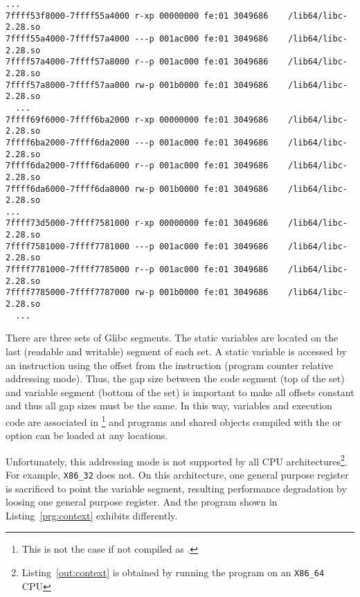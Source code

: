 \begin{lstlisting}[basicstyle=\tiny\tt, frame=tRBl, label=out:glibc-segs]
  ...
7ffff53f8000-7ffff55a4000 r-xp 00000000 fe:01 3049686    /lib64/libc-2.28.so
7ffff55a4000-7ffff57a4000 ---p 001ac000 fe:01 3049686    /lib64/libc-2.28.so
7ffff57a4000-7ffff57a8000 r--p 001ac000 fe:01 3049686    /lib64/libc-2.28.so
7ffff57a8000-7ffff57aa000 rw-p 001b0000 fe:01 3049686    /lib64/libc-2.28.so
  ...
7ffff69f6000-7ffff6ba2000 r-xp 00000000 fe:01 3049686    /lib64/libc-2.28.so
7ffff6ba2000-7ffff6da2000 ---p 001ac000 fe:01 3049686    /lib64/libc-2.28.so
7ffff6da2000-7ffff6da6000 r--p 001ac000 fe:01 3049686    /lib64/libc-2.28.so
7ffff6da6000-7ffff6da8000 rw-p 001b0000 fe:01 3049686    /lib64/libc-2.28.so
...
7ffff73d5000-7ffff7581000 r-xp 00000000 fe:01 3049686    /lib64/libc-2.28.so
7ffff7581000-7ffff7781000 ---p 001ac000 fe:01 3049686    /lib64/libc-2.28.so
7ffff7781000-7ffff7785000 r--p 001ac000 fe:01 3049686    /lib64/libc-2.28.so
7ffff7785000-7ffff7787000 rw-p 001b0000 fe:01 3049686    /lib64/libc-2.28.so
  ...
\end{lstlisting}

There are three sets of Glibc segments. The static variables are
located on the last (readable and writable) segment of each set. A
static variable is accessed by an instruction using the offset from
the instruction (program counter relative addressing mode). Thus, the
gap size between the code segment (top of the set) and variable segment
(bottom of the set) is important to make all offsets constant and thus
all gap sizes must be the same. In this way, variables and execution
code are associated in \PIE\footnote{This is not the case if not
compiled as \PIE.} and \PIE programs and shared objects compiled with
the \PIE or \PIC option can be loaded at any locations.

Unfortunately, this addressing mode is not supported by all CPU
architectures\footnote{Listing~\ref{out:context} is obtained by
running the program on an {\tt X86_64} CPU}. For example, {\tt X86_32} 
does not. On this architecture, one general purpose
register is sacrificed to point the variable segment, resulting
performance degradation by loosing one general purpose register. And
the program shown in Listing~\ref{prg:context} exhibits differently. 
